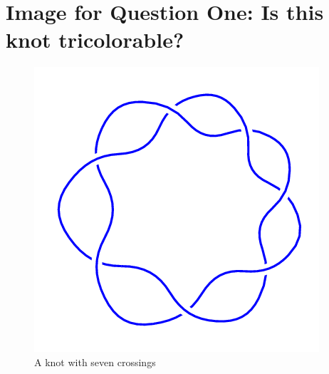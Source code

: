 \documentclass[12pt,letterpaper]{article}
\theoremstyle{definition}
\begin{document}
\clearpage

\section*{Image for Question One: Is this knot tricolorable?}

\begin{figure}[h]
    \centering
    \includegraphics[width=.5\textwidth]{meeting09pics/7_1.png}
    \caption{A knot with seven crossings}
\end{figure}
\end{document}
